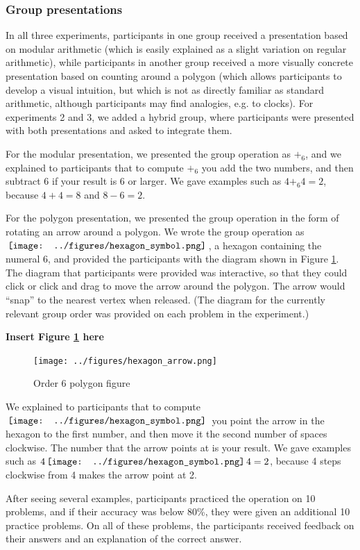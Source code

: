 \documentclass[man,10pt]{apa6}
\newcommand{\hex}{\,\vcenter{\hbox{\texttt{[image: ../figures/hexagon\_symbol.png]}}}\,}
\begin{document}
\subsubsection{Group presentations}
In all three experiments, participants in one group received a presentation based on modular arithmetic (which is easily explained as a slight variation on regular arithmetic), while participants in another group received a more visually concrete presentation based on counting around a polygon (which allows participants to develop a visual intuition, but which is not as directly familiar as standard arithmetic, although participants may find analogies, e.g. to clocks). For experiments 2 and 3, we added a hybrid group, where participants were presented with both presentations and asked to integrate them. \par 
For the modular presentation, we presented the group operation as $+_6$, and we explained to participants that to compute $+_6$ you add the two numbers, and then subtract $6$ if your result is $6$ or larger. We gave examples such as $4 +_6 4 = 2$, because $4+4 = 8$ and $8-6=2$.\par
For the polygon presentation, we presented the group operation in the form of rotating an arrow around a polygon. We wrote the group operation as $\hex$, a hexagon containing the numeral $6$, and provided the participants with the diagram shown in Figure \ref{hexagonex}. The diagram that participants were provided was interactive, so that they could click or click and drag to move the arrow around the polygon. The arrow would ``snap'' to the nearest vertex when released. (The diagram for the currently relevant group order was provided on each problem in the experiment.)
\begin{center} 
{\bf Insert Figure \ref{hexagonex} here} 
\end{center}
\begin{figure} \centering \texttt{[image: ../figures/hexagon\_arrow.png]} \caption{Order 6 polygon figure} \label{hexagonex} 
\end{figure} 
\noindent
We explained to participants that to compute $\hex$ you point the arrow in the hexagon to the first number, and then move it the second number of spaces clockwise. The number that the arrow points at is your result. We gave examples such as $4 \hex 4 = 2$, because 4 steps clockwise from 4 makes the arrow point at 2. \par
After seeing several examples, participants practiced the operation on 10 problems, and if their accuracy was below 80\%, they were given an additional 10 practice problems. On all of these problems, the participants received feedback on their answers and an explanation of the correct answer. \par 
\end{document}

